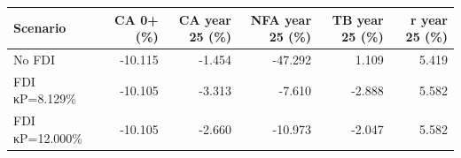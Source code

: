 \begin{table}[!ht]
\setlength\tabcolsep{0.425em}
\setlength\aboverulesep{0pt}
\setlength\belowrulesep{0.2em}
\centering
\begin{threeparttable}
\begin{tabular}{lrrrrr}
\toprule[0.1em]
\textbf{Scenario} & \textbf{CA 0+ (\%)} & \textbf{CA year 25 (\%)} & \textbf{NFA year 25 (\%)} & \textbf{TB year 25 (\%)} & \textbf{r year 25 (\%)} \\[0.2em]
\midrule[0.075em]
No FDI & -10.115 & -1.454 & -47.292 & 1.109 & 5.419 \\[0.2em]
FDI κP=8.129\% & -10.105 & -3.313 & -7.610 & -2.888 & 5.582 \\[0.2em]
FDI κP=12.000\% & -10.105 & -2.660 & -10.973 & -2.047 & 5.582 \\[0.2em]
\bottomrule[0.1em]
\end{tabular}
\end{threeparttable}
\end{table}
